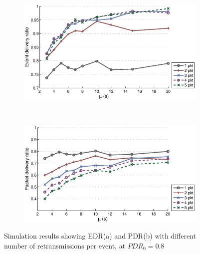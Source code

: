 \begin{figure}[p]
    \centering
    \begin{subfigure}[t]{0.7\textwidth}
        \centering
        \includegraphics[width=\textwidth] {../../sw/pc/matlab/simulation-result/retrans-count-edr-20min-pdr0.8.eps}
        \caption{}
    \end{subfigure} 
    \\
    \begin{subfigure}[t]{0.7\textwidth}
        \centering
        \includegraphics[width=\textwidth] {../../sw/pc/matlab/simulation-result/retrans-count-pdr-20min-pdr0.8.eps}
        \caption{}
    \end{subfigure}
    \caption[EDR and PDR with different transmission redundancy, $PDR_0 = 0.8$]{Simulation results showing EDR(a) and PDR(b) with different number of retransmissions per event, at $PDR_0 = 0.8$}\label{fig:retrans-lambda-0.8}
\end{figure}



